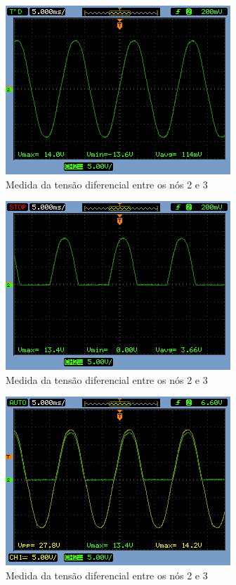\documentclass[a4paper]{article} %
\begin{document}
\begin{figure}[h!]
\begin{centering}
\includegraphics[scale=0.7]{Imagens/3.3.1onda_completa/p1q3} \caption{Medida da tensão diferencial entre os nós 2 e 3 \label{fig:Fig-45}}
\par\end{centering}
\end{figure}



\newpage
\begin{figure}[h!]
\begin{centering}
\includegraphics[scale=0.7]{Imagens/3.3.1onda_completa/p2q3} \caption{Medida da tensão diferencial entre os nós 2 e 3 \label{fig:Fig-45}}
\par\end{centering}
\end{figure}

\begin{figure}[h!]
\begin{centering}
\includegraphics[scale=0.7]{Imagens/3.3.1ret_meia_onda/311} \caption{Medida da tensão diferencial entre os nós 2 e 3 \label{fig:Fig-45}}
\par\end{centering}
\end{figure}
\end{document}
